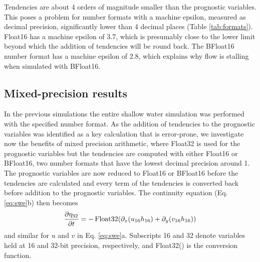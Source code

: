 Tendencies are about 4 orders of magnitude smaller than the prognostic variables. This poses a problem for number formats
with a machine epsilon, measured as decimal precision, significantly lower than 4 decimal places (Table \ref{tab:formats}).
Float16 has a machine epsilon of 3.7, which is presumably close to the lower limit beyond which the addition of tendencies
will be round back. The BFloat16 number format has a machine epsilon of 2.8, which explains why flow is stalling when
simulated with BFloat16.

\subsection{Mixed-precision results}
\label{sec:swm_results_mixed}

In the previous simulations the entire shallow water simulation was performed with the specified number format. As the addition
of tendencies to the prognostic variables was identified as a key calculation that is error-prone, we investigate now the benefits
of mixed precision arithmetic, where Float32 is used for the prognostic variables but the tendencies are computed with either
Float16 or BFloat16, two number formats that have the lowest decimal precision around 1. The prognostic variables are now
reduced to Float16 or BFloat16 before the tendencies are calculated and every term of the tendencies is converted back before
addition to the prognostic variables. The continuity equation (Eq. \ref{eq:swe}b) then becomes
\begin{equation}
\frac{\partial \eta_{32}}{\partial t} = -\operatorname{Float32}( \partial_x(u_{16}h_{16})
+ \partial_y(v_{16}h_{16} ))
\label{eq:conversion}
\end{equation}
and similar for $u$ and $v$ in Eq. \ref{eq:swe}a. Subscripts 16 and 32 denote variables held at 16 and 32-bit precision, respectively,
and Float32() is the conversion function.


